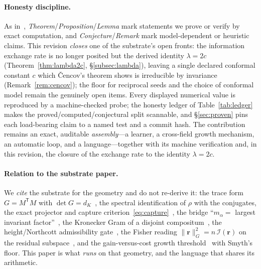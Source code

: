 \documentclass[11pt]{article}
\theoremstyle{plain}
\theoremstyle{definition}
\theoremstyle{remark}
\newcommand{\K}{K}
\newcommand{\Fish}{\mathcal{I}}
\newcommand{\rr}{\mathbf{r}}
\newcommand{\GG}{G}
\newcommand{\transpose}{^{\mathsf{T}}}
\begin{document}
\paragraph{Honesty discipline.} As in~\cite{VectorSubstrate}, \emph{Theorem}/\emph{Proposition}/\emph{Lemma}
mark statements we prove or verify by exact computation, and \emph{Conjecture}/\emph{Remark} mark
model-dependent or heuristic claims. This revision \emph{closes} one of the substrate's open fronts: the
information exchange rate is no longer posited but the derived identity $\lambda=2c$ (Theorem~\ref{thm:lambda2c},
\S\ref{subsec:lambda}), leaving a single declared conformal constant $c$ which \v{C}encov's theorem shows is
irreducible by invariance (Remark~\ref{rem:cencov}); the floor for reciprocal seeds and the choice of conformal
model remain the genuinely open items. Every displayed numerical value is reproduced by a machine-checked probe;
the honesty ledger of Table~\ref{tab:ledger} makes the proved/computed/conjectural split scannable, and
\S\ref{sec:proven} pins each load-bearing claim to a named test and a commit hash. The contribution remains an
exact, auditable \emph{assembly}---a learner, a cross-field growth mechanism, an automatic loop, and a
language---together with its machine verification and, in this revision, the closure of the exchange rate to the
identity $\lambda=2c$.

\paragraph{Relation to the substrate paper.} We \emph{cite} the substrate for the geometry and do not
re-derive it: the trace form $\GG=M\transpose M$ with $\det\GG=d_\K$~\cite[Thm.~2.13]{VectorSubstrate}, the
spectral identification of $\rho$ with the conjugates, the exact projector and capture
criterion~\eqref{eq:capture}~\cite[Prop.~3.2]{VectorSubstrate}, the bridge ``$m_\alpha=$ largest invariant
factor''~\cite[Thm.~4.3]{VectorSubstrate}, the Kronecker Gram of a disjoint
compositum~\cite[Prop.~4.6]{VectorSubstrate}, the height/Northcott admissibility
gate~\cite[Prop.~5.5]{VectorSubstrate}, the Fisher reading $\lVert\rr\rVert_\GG^2=n\,\Fish(\rr)$ on the
residual subspace~\cite[Thm.~7.11]{VectorSubstrate}, and the gain-versus-cost growth
threshold~\cite[\S8]{VectorSubstrate} with Smyth's floor. This paper is what \emph{runs} on that geometry, and
the language that shares its arithmetic.
\end{document}
